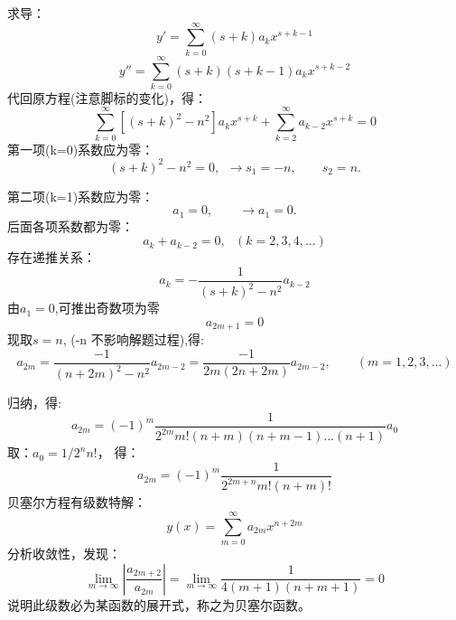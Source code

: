 \begin{frame}
	求导：
	\begin{equation*}
		y'=\sum\limits_{k=0}^{\infty} (s+k) a_k x^{s+k-1}
	\end{equation*}	
	\begin{equation*}
		y''=\sum\limits_{k=0}^{\infty} (s+k) (s+k-1) a_k x^{s+k-2}
	\end{equation*}	
	代回原方程(注意脚标的变化)，得：
	\begin{equation*}
		\sum\limits_{k=0}^{\infty} [(s+k) ^2 -n^2]  a_k x^{s+k} + \sum\limits_{k=2}^{\infty}  a_{k-2} x^{s+k} =0
	\end{equation*}	
	第一项(k=0)系数应为零：
	\begin{equation*}
		(s+k) ^2 -n^2=0,~~ \to s_1=-n, \qquad s_2=n. 
	\end{equation*}	
\end{frame}	

\begin{frame}
	第二项(k=1)系数应为零：
	\begin{equation*}
		[(s+k) ^2 -n^2] a_1=0,\qquad \to a_1=0. 
	\end{equation*}	
	后面各项系数都为零：
	\begin{equation*}
		[(s+k) ^2 -n^2] a_k+ a_{k-2}=0, ~~~ (k=2,3,4,...)
	\end{equation*}	
	存在递推关系：
	\begin{equation*}
		a_k=-\frac{1}{(s+k) ^2 -n^2 } a_{k-2}
	\end{equation*}	
	由$a_1=0$,可推出奇数项为零 \[a_{2m+1}=0\]
	现取$s=n$, (-n 不影响解题过程),得:
	\begin{equation*}
		a_{2m}=\frac{-1}{(n+2m) ^2 -n^2 } a_{2m-2} =\frac{-1}{2m (2n+2m) } a_{2m-2}, \qquad (m=1,2,3,...)
	\end{equation*}	
\end{frame}	

\begin{frame}
	归纳，得:
	\begin{equation*}
		a_{2m}=(-1)^m  \frac{1}{2^{2m} m! (n+m) (n+m-1)... (n+1) } a_0 
	\end{equation*}	
	取：$a_0=1/2^n n!$， 得：
	\begin{equation*}
		a_{2m}=(-1)^m  \frac{1}{2^{2m+n} m! (n+m) ! }
	\end{equation*}	
	贝塞尔方程有级数特解：
	\begin{equation*}
		y(x) = \sum\limits_{m=0}^{\infty} a_{2m} x^{n+2m} 
	\end{equation*}	
	分析收敛性，发现：
	\begin{equation*}
		\lim\limits_{m\to \infty}|\frac{ a_{2m+2}} {a_{2m}}|= \lim\limits_{m\to \infty}\frac{ 1}{4(m+1)(n+m+1)} =0
	\end{equation*}	
	说明此级数必为某函数的展开式，称之为贝塞尔函数。
\end{frame}	

